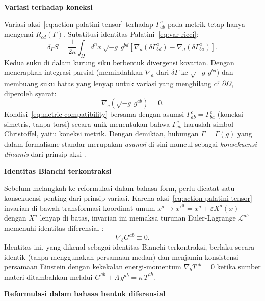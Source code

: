 \vspace{0.5em}
\noindent \textbf{Variasi terhadap koneksi}

Variasi aksi~\eqref{eq:action-palatini-tensor} terhadap $\Gamma^c_{ab}$ pada metrik tetap hanya mengenai $R_{cd}(\Gamma)$. Substitusi identitas Palatini~\eqref{eq:var-ricci}:
\begin{equation}
    \delta_\Gamma S = \frac{1}{2\kappa}\int_\Omega d^n x\, \sqrt{-g}\, g^{bd}\left[\nabla_a(\delta\Gamma^a_{bd}) - \nabla_d(\delta\Gamma^a_{ba})\right].
\end{equation}
Kedua suku di dalam kurung siku berbentuk divergensi kovarian. Dengan menerapkan integrasi parsial (memindahkan $\nabla_a$ dari $\delta\Gamma$ ke $\sqrt{-g}\, g^{bd}$) dan membuang suku batas yang lenyap untuk variasi yang menghilang di $\partial\Omega$, diperoleh syarat:
\begin{equation}\label{eq:metric-compatibility}
    \nabla_c\!\left(\sqrt{-g}\, g^{ab}\right) = 0.
\end{equation}
Kondisi~\eqref{eq:metric-compatibility} bersama dengan asumsi $\Gamma^c_{ab} = \Gamma^c_{ba}$ (koneksi simetris, tanpa torsi) secara unik menentukan bahwa $\Gamma^c_{ab}$ haruslah simbol Christoffel, yaitu koneksi metrik. Dengan demikian, hubungan $\Gamma = \Gamma(g)$ yang dalam formalisme standar merupakan \textit{asumsi} di sini muncul sebagai \textit{konsekuensi dinamis} dari prinsip aksi \cite{dinverno1992introducing}.


\vspace{0.5em}
\noindent \textbf{Identitas Bianchi terkontraksi}

Sebelum melangkah ke reformulasi dalam bahasa form, perlu dicatat satu konsekuensi penting dari prinsip variasi. Karena aksi~\eqref{eq:action-palatini-tensor} invarian di bawah transformasi koordinat umum $x^a \to x'^a = x^a + \varepsilon X^a(x)$ dengan $X^a$ lenyap di batas, invarian ini memaksa turunan Euler-Lagrange $\mathscr{L}^{ab}$ memenuhi identitas diferensial \cite{dinverno1992introducing}:
\begin{equation}\label{eq:contracted-bianchi}
    \nabla_b G^{ab} \equiv 0.
\end{equation}
Identitas ini, yang dikenal sebagai identitas Bianchi terkontraksi, berlaku secara identik (tanpa menggunakan persamaan medan) dan menjamin konsistensi persamaan Einstein dengan kekekalan energi-momentum $\nabla_b T^{ab} = 0$ ketika sumber materi ditambahkan melalui $G^{ab} + \Lambda\, g^{ab} = \kappa\, T^{ab}$.


\vspace{0.5em}
\noindent \textbf{Reformulasi dalam bahasa bentuk diferensial}

